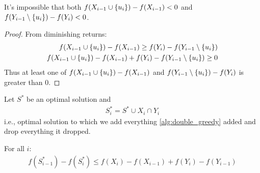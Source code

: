 \begin{prop}
	It's impossible that both $f(X_{i-1} \cup \qty{u_i})-f(X_{i-1}) <0$ and  $f(Y_{i-1} \setminus \qty{u_i}) - f(Y_i)<0$.
	\begin{proof}
		From diminishing returns:
		\begin{align}
		f(X_{i-1} \cup \qty{u_i})-f(X_{i-1}) \geq f(Y_i) - f(Y_{i-1} \setminus \qty{u_i})  \\
		f(X_{i-1} \cup \qty{u_i})-f(X_{i-1}) + f(Y_i) - f(Y_{i-1} \setminus \qty{u_i}) \geq 0
		\end{align}
		Thus at least one of  $f(X_{i-1} \cup \qty{u_i})-f(X_{i-1}) $ and  $f(Y_{i-1} \setminus \qty{u_i}) - f(Y_i)$ is greater than $0$.
	\end{proof}
\end{prop}


\begin{lemma}
	Let $S^*$ be an optimal solution and 
	\begin{align}
	S^*_i = S^* \cup X_i \cap Y_i
	\end{align}
	i.e., optimal solution to which we add everything \cref{alg:double_greedy} added and drop everything it dropped.
	
	For all $i$:
	\begin{align}
	f(S^*_{i-1}) - f(S^*_i) \leq f(X_i) - f(X_{i-1})+f(Y_i) - f(Y_{i-1}) 
	\end{align}
\end{lemma}

